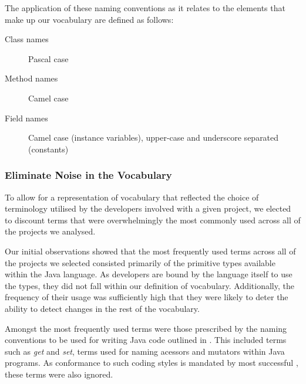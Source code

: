 The application of these naming conventions as it relates to the elements that make up our vocabulary are defined as follows:

\begin{description}
	\item[Class names] Pascal case
	\item[Method names] Camel case 
	\item[Field names] Camel case (instance variables), upper-case and underscore separated (constants)
\end{description}


\subsubsection{Eliminate Noise in the Vocabulary} %
\label{ssub:eliminate_noise_in_the_vocabulary}



To allow for a representation of vocabulary that reflected the choice of terminology utilised by the developers involved with a given project, we elected to discount terms that were overwhelmingly the most commonly used across all of the projects we analysed.

Our initial observations showed that the most frequently used terms across all of the projects we selected consisted primarily of the primitive types available within the Java language. As developers are bound by the language itself to use the types, they did not fall within our definition of vocabulary. Additionally, the frequency of their usage was sufficiently high that they were likely to deter the ability to detect changes in the rest of the vocabulary.

Amongst the most frequently used terms were those prescribed by the naming conventions to be used for writing Java code outlined in \cite{Reddy00a}. This included terms such as \emph{get} and \emph{set}, terms used for naming acessors and mutators within Java programs. As conformance to such coding styles is mandated by most successful \OSYS, these terms were also ignored.


